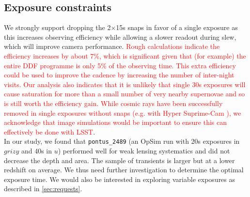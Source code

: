 \documentclass[12pt, letterpaper]{article}
\newcommand{\review}[1]{{\textcolor{red}{#1}}}
\begin{document}
\subsection{Exposure constraints}
We strongly support dropping the 2$\times$15s snaps in favor of a single exposure as this increases observing efficiency while allowing a slower readout during slew, which will improve camera performance.  \review{Rough calculations indicate the efficiency increases by about 7\%, which is significant given that (for example) the entire DDF programme is only 5\% of the observing time. This extra efficiency could be used to improve the cadence by increasing the number of inter-night visits. \review{Our analysis also indicates that it is unlikely that single 30s exposures will cause saturation for more than a small number of very nearby supernovae and so is still worth the efficiency gain.} While cosmic rays have been successfully removed in single exposures without snaps (e.g. with Hyper Suprime-Cam \cite{aihara2017}), we acknowledge that image simulations would be important to ensure this can effectively be done with LSST}.\\ 
In our study, we found that \texttt{pontus\_2489} (an OpSim run with 20s exposures in $grizy$ and 40s in $u$) performed well for weak lensing systematics and did not decrease the depth and area. The sample of transients is larger but at a lower redshift on average. We thus need further investigation to determine the optimal exposure time. 
We would also be interested in exploring variable exposures as described in \autoref{sec:requests}. 
\end{document}
